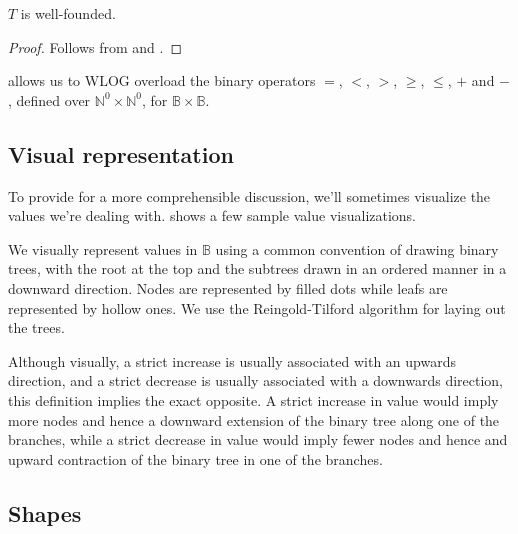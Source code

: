 \begin{corollary} $T$ is well-founded.\end{corollary}

\begin{proof} Follows from  and
.\end{proof} 

\begin{definition}  allows us to WLOG overload the
binary operators $=$, $<$, $>$, $\geq$, $\leq$, $+$ and $-$, defined over
$\mathbb{N}^0\times\mathbb{N}^0$, for
$\mathbb{B}\times\mathbb{B}$.\end{definition}

\subsection{Visual representation}

To provide for a more comprehensible discussion, we'll sometimes visualize the
values we're dealing with.  shows a few
sample value visualizations.

\begin{definition}\label{definition:value-visualization} We visually represent
values in $\mathbb{B}$ using a common convention of drawing binary trees, with
the root at the top and the subtrees drawn in an ordered manner in a downward
direction. Nodes are represented by filled dots while leafs are represented by
hollow ones. We use the Reingold-Tilford algorithm\cite{reingold-tilford} for
laying out the trees.\end{definition}


Although visually, a strict increase is usually associated with an upwards
direction, and a strict decrease is usually associated with a downwards
direction, this definition implies the exact opposite. A strict increase in
value would imply more nodes and hence a downward extension of the binary tree
along one of the branches, while a strict decrease in value would imply fewer
nodes and hence and upward contraction of the binary tree in one of the
branches.

\subsection{Shapes}

